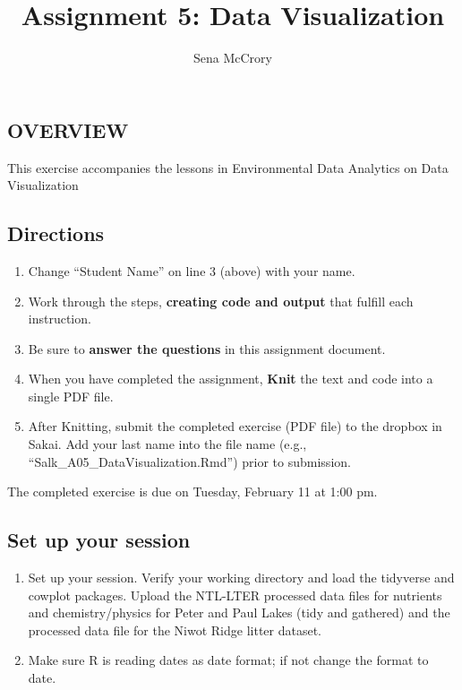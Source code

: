 \documentclass[
]{article}
\title{Assignment 5: Data Visualization}
\author{Sena McCrory}
\date{}
\providecommand{\tightlist}{%
  \setlength{\itemsep}{0pt}\setlength{\parskip}{0pt}}
\begin{document}
\maketitle

\hypertarget{overview}{%
\subsection{OVERVIEW}\label{overview}}

This exercise accompanies the lessons in Environmental Data Analytics on
Data Visualization

\hypertarget{directions}{%
\subsection{Directions}\label{directions}}

\begin{enumerate}
\def\labelenumi{\arabic{enumi}.}
\tightlist
\item
  Change ``Student Name'' on line 3 (above) with your name.
\item
  Work through the steps, \textbf{creating code and output} that fulfill
  each instruction.
\item
  Be sure to \textbf{answer the questions} in this assignment document.
\item
  When you have completed the assignment, \textbf{Knit} the text and
  code into a single PDF file.
\item
  After Knitting, submit the completed exercise (PDF file) to the
  dropbox in Sakai. Add your last name into the file name (e.g.,
  ``Salk\_A05\_DataVisualization.Rmd'') prior to submission.
\end{enumerate}

The completed exercise is due on Tuesday, February 11 at 1:00 pm.

\hypertarget{set-up-your-session}{%
\subsection{Set up your session}\label{set-up-your-session}}

\begin{enumerate}
\def\labelenumi{\arabic{enumi}.}
\item
  Set up your session. Verify your working directory and load the
  tidyverse and cowplot packages. Upload the NTL-LTER processed data
  files for nutrients and chemistry/physics for Peter and Paul Lakes
  (tidy and gathered) and the processed data file for the Niwot Ridge
  litter dataset.
\item
  Make sure R is reading dates as date format; if not change the format
  to date.
\end{enumerate}
\end{document}
